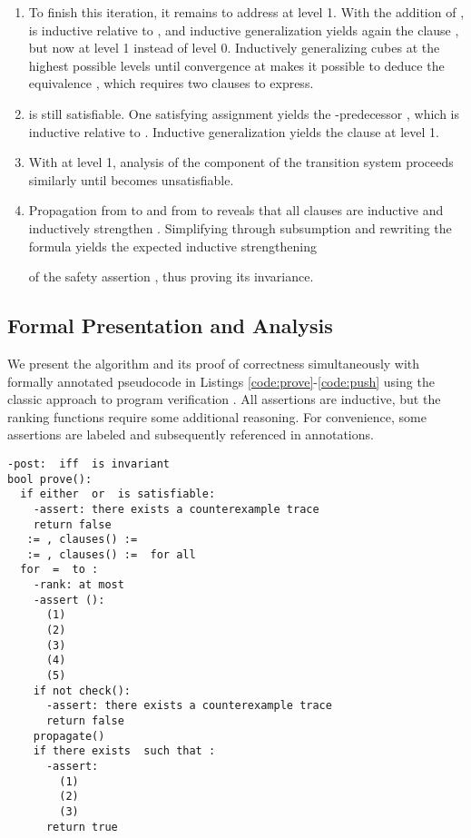 \documentclass{llncs}
\begin{document}
\begin{enumerate}
\item To finish this iteration, it remains to address  at level
  1.  With the addition of ,  is inductive relative to
  , and inductive generalization yields again the clause , but now at level 1 instead of level 0.  Inductively
  generalizing cubes at the highest possible levels until convergence
  at  makes it possible to deduce the equivalence , which requires two clauses to express.

\item  is still satisfiable.  One
  satisfying assignment yields the -predecessor , which is inductive relative to .  Inductive
  generalization yields the clause  at level 1.

\item With  at level 1, analysis of the  component of the
  transition system proceeds similarly until  becomes unsatisfiable.

\item Propagation from  to  and from  to 
  reveals that all clauses are inductive and inductively strengthen
  .  Simplifying through subsumption and rewriting the formula
  yields the expected inductive strengthening

of the safety assertion , thus proving its invariance.
\end{enumerate}

\subsection{Formal Presentation and Analysis}
\label{subsec:formal}

We present the algorithm and its proof of correctness simultaneously
with formally annotated pseudocode in Listings
\ref{code:prove}-\ref{code:push} using the classic approach to program
verification \cite{Floyd:Verification:1967,Hoare:Verification:1969}.
All assertions are inductive, but the ranking functions require some
additional reasoning.  For convenience, some assertions are labeled
and subsequently referenced in annotations.

\newcommand{\vmin}{\mathit{min}}
\newcommand{\vrv}{\mathit{rv}}
\newcommand{\vstates}{\mathit{states}}
\begin{lstlisting}[name=code,caption={The main function},label=code:prove,float=tb]
-post:  iff  is invariant
bool prove():
  if either  or  is satisfiable:
    -assert: there exists a counterexample trace
    return false
   := , clauses() := 
   := , clauses() :=  for all 
  for  =  to :
    -rank: at most 
    -assert (): 
      (1) 
      (2) 
      (3) 
      (4) 
      (5) 
    if not check():
      -assert: there exists a counterexample trace
      return false
    propagate()
    if there exists  such that :
      -assert:
        (1) 
        (2) 
        (3) 
      return true
\end{lstlisting}
\end{document}
